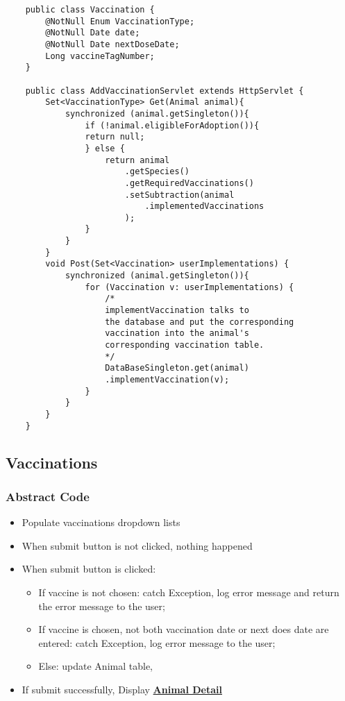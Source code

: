\documentclass[a4paper]{article}
\begin{document}
\begin{lstlisting}
	public class Vaccination {
		@NotNull Enum VaccinationType;
		@NotNull Date date;
		@NotNull Date nextDoseDate;
		Long vaccineTagNumber;
	}

	public class AddVaccinationServlet extends HttpServlet {
		Set<VaccinationType> Get(Animal animal){
			synchronized (animal.getSingleton()){
				if (!animal.eligibleForAdoption()){
				return null;
				} else {
					return animal
						.getSpecies()
						.getRequiredVaccinations()
						.setSubtraction(animal
							.implementedVaccinations
						);
				}
			}
		}
		void Post(Set<Vaccination> userImplementations) {
			synchronized (animal.getSingleton()){
				for (Vaccination v: userImplementations) {
					/*
					implementVaccination talks to
					the database and put the corresponding
					vaccination into the animal's
					corresponding vaccination table.
					*/
					DataBaseSingleton.get(animal)
					.implementVaccination(v);
				}
			}
		}
	}
\end{lstlisting}


\hypertarget{vaccinations}{\subsection{Vaccinations}}

\subsubsection*{Abstract Code}

\begin{itemize}
	\item Populate vaccinations dropdown lists
	\item When submit button is not clicked, nothing happened
	\item When submit button is clicked:
	\begin{itemize}
	    \item If vaccine is not chosen: catch Exception, log error message and return the error message to the user;
	    \item If vaccine is chosen, not both vaccination date or next does date are entered: catch Exception, log error message to the user;
	    \item  Else: update Animal table,
	 \end{itemize}
	 \item If submit successfully, Display \underline{\textbf{Animal Detail}}
\end{itemize}
\end{document}
